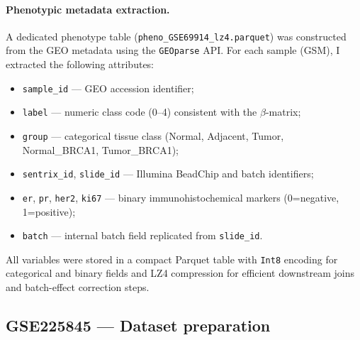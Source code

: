\documentclass[10pt]{extarticle}
\begin{document}
\paragraph{Phenotypic metadata extraction.}
A dedicated phenotype table (\texttt{pheno\_GSE69914\_lz4.parquet}) was constructed from the GEO metadata using the \texttt{GEOparse} API.  
For each sample (GSM), I extracted the following attributes:
\begin{itemize}[label=-]
  \item \texttt{sample\_id} — GEO accession identifier;
  \item \texttt{label} — numeric class code (0–4) consistent with the $\beta$-matrix;
  \item \texttt{group} — categorical tissue class (Normal, Adjacent, Tumor, Normal\_BRCA1, Tumor\_BRCA1);
  \item \texttt{sentrix\_id}, \texttt{slide\_id} — Illumina BeadChip and batch identifiers;
  \item \texttt{er}, \texttt{pr}, \texttt{her2}, \texttt{ki67} — binary immunohistochemical markers (0=negative, 1=positive);
  \item \texttt{batch} — internal batch field replicated from \texttt{slide\_id}.
\end{itemize}
All variables were stored in a compact Parquet table with \texttt{Int8} encoding for categorical and binary fields and LZ4 compression for efficient downstream joins and batch-effect correction steps.

\subsection{GSE225845 — Dataset preparation}
\end{document}
